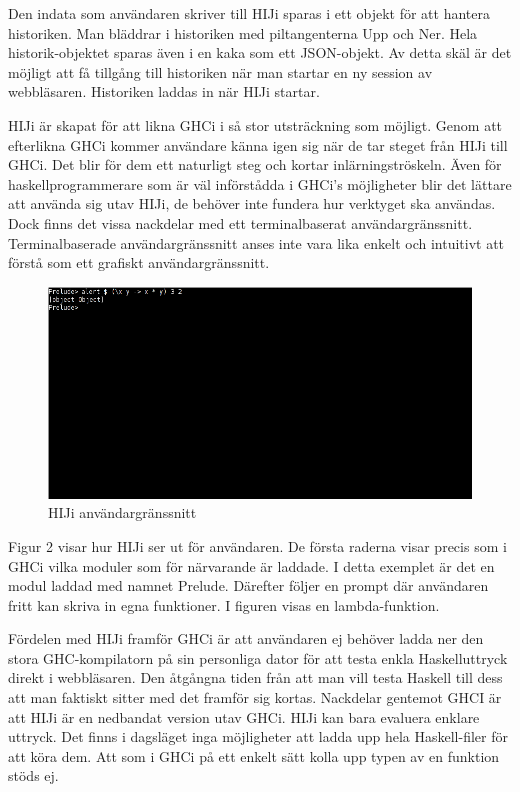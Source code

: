 Den indata som användaren skriver till HIJi sparas i ett objekt för att hantera historiken. Man bläddrar i historiken med piltangenterna Upp och Ner. Hela historik-objektet sparas även i en kaka som ett JSON-objekt. Av detta skäl är det möjligt att få tillgång till historiken när man startar en ny session av webbläsaren. Historiken laddas in när HIJi startar. 

HIJi är skapat för att likna GHCi i så stor utsträckning som möjligt.
Genom att efterlikna GHCi kommer användare känna igen sig när de tar steget från HIJi till GHCi. Det blir för dem ett naturligt steg och kortar inlärningströskeln. Även för haskellprogrammerare som är väl införstådda i GHCi's möjligheter blir det lättare att använda sig utav HIJi, de behöver inte fundera hur verktyget ska användas.
Dock finns det vissa nackdelar med ett terminalbaserat användargränssnitt. Terminalbaserade användargränssnitt anses inte vara lika enkelt och intuitivt att förstå som ett grafiskt användargränssnitt. 

\begin{figure}[H]
    \begin{center}
        \includegraphics[width=1\textwidth]{hiji_screen3.png}
        \caption{HIJi användargränssnitt}
    \end{center}
\end{figure}

Figur 2 visar hur HIJi ser ut för användaren. De första raderna visar precis som i GHCi vilka moduler som för närvarande är laddade. I detta exemplet är det en modul laddad med namnet Prelude. Därefter följer en prompt där användaren fritt kan skriva in egna funktioner. I figuren visas en lambda-funktion.



Fördelen med HIJi framför GHCi är att användaren ej behöver ladda ner den stora GHC-kompilatorn på sin personliga dator för att testa enkla Haskelluttryck direkt i webbläsaren. Den åtgångna tiden från  att man vill testa Haskell till dess att man faktiskt sitter med det framför sig kortas. 
Nackdelar gentemot GHCI är att HIJi är en nedbandat version utav GHCi. HIJi kan bara evaluera enklare uttryck. Det finns i dagsläget inga möjligheter att ladda upp hela Haskell-filer för att köra dem. Att som i GHCi på ett enkelt sätt kolla upp  typen av en funktion stöds ej.


